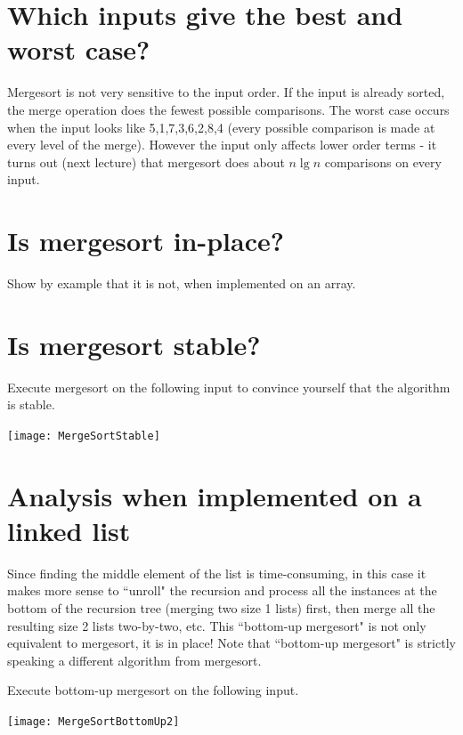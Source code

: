 \section{Which inputs give the best and worst case?}
Mergesort is not very sensitive to the input order. 
If the input is already sorted, the merge operation does the fewest possible comparisons. The worst case occurs when the input looks like 5,1,7,3,6,2,8,4 (every possible comparison is made at every level of the merge). However the input only affects lower order terms - it turns out 
(next lecture)  that mergesort does about $n\lg n$ comparisons on every input.

\section{Is mergesort in-place?}
\begin{Boxample}[4]
Show by example that it is not, when implemented on an array.
\end{Boxample}

\section{Is mergesort stable?}

\begin{Boxample}[0]
Execute mergesort on the following input to convince yourself that the algorithm is stable.
\begin{center}
\texttt{[image: MergeSortStable]} 
\end{center} 
\end{Boxample}

\section{Analysis when implemented on a linked list}
Since finding the middle element of the list is time-consuming, in this case it makes more sense to ``unroll" the recursion and process all the instances at the bottom of the recursion tree (merging two size 1 lists) first, then merge all the resulting size 2 lists two-by-two, etc. This ``bottom-up mergesort" is not only equivalent to mergesort, it is in place! Note that ``bottom-up mergesort" is strictly speaking a different algorithm from mergesort.

\begin{Boxample}[0]
Execute  bottom-up mergesort  on the following input.
\begin{center}
\texttt{[image: MergeSortBottomUp2]}
\end{center}
\end{Boxample}


